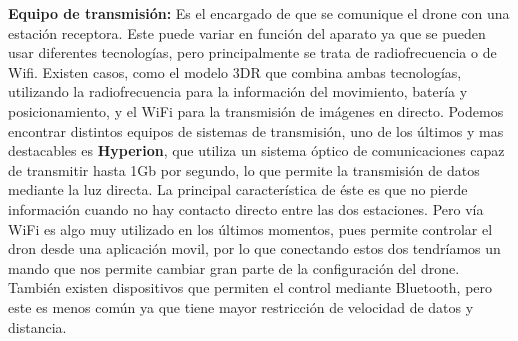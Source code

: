 \hspace{1 cm}\textbf{Equipo de transmisi\'on:} Es el encargado de que se comunique el drone con una estaci\'on receptora. Este puede variar en funci\'on del aparato ya que se pueden usar diferentes tecnolog\'ias, pero principalmente se trata de radiofrecuencia o de Wifi. Existen casos, como el modelo 3DR que combina ambas tecnolog\'ias, utilizando la radiofrecuencia para la informaci\'on del movimiento, bater\'ia y posicionamiento, y el WiFi para la transmisi\'on de im\'agenes en directo. Podemos encontrar distintos equipos de sistemas de transmisi\'on, uno de los \'ultimos y mas destacables es \textbf{Hyperion}, que utiliza un sistema \'optico de comunicaciones capaz de transmitir hasta 1Gb por segundo, lo que permite la transmisi\'on de datos mediante la luz directa. La principal caracter\'istica de \'este es que no pierde informaci\'on cuando no hay contacto directo entre las dos estaciones. Pero v\'ia WiFi es algo muy utilizado en los \'ultimos momentos, pues permite controlar el dron desde una aplicaci\'on movil, por lo que conectando estos dos tendr\'iamos un mando que nos permite cambiar gran parte de la configuraci\'on del drone. Tambi\'en existen dispositivos que permiten el control mediante Bluetooth, pero este es menos com\'un ya que tiene mayor restricci\'on de velocidad de datos y distancia. 


